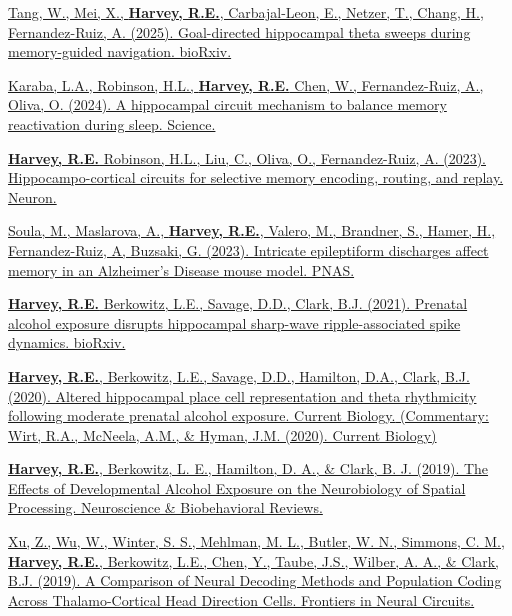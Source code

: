 \begin{cventries}
\cventry
    {} %
    {} %
    {} %
    {} %
    {
      \begin{cvitems} %
      \setlength\itemsep{0.5em}
            \item {\href{ https://doi.org/10.1101/2025.08.26.672489}{Tang, W., Mei, X., \textbf{Harvey, R.E.}, Carbajal-Leon, E., Netzer, T., Chang, H., Fernandez-Ruiz, A.  (2025). Goal-directed hippocampal theta sweeps during memory-guided navigation. bioRxiv.}}     
            \item {\href{https://doi.org/10.1126/science.ado5708}{Karaba, L.A., Robinson, H.L., \textbf{Harvey, R.E.}  Chen, W., Fernandez-Ruiz, A., Oliva, O.  (2024). A hippocampal circuit mechanism to balance memory reactivation during sleep. Science.}}
            \item {\href{https://doi.org/10.1016/j.neuron.2023.04.015}{\textbf{Harvey, R.E.} Robinson, H.L., Liu, C., Oliva, O., Fernandez-Ruiz, A. (2023). Hippocampo-cortical circuits for selective memory encoding, routing, and replay. Neuron.}}
            \item {\href{https://doi.org/10.1073/pnas.2302676120 }{Soula, M., Maslarova, A., \textbf{Harvey, R.E.}, Valero, M., Brandner, S., Hamer, H., Fernandez-Ruiz, A, Buzsaki, G. (2023). Intricate epileptiform discharges affect memory in an Alzheimer's Disease mouse model. PNAS.}}
            \item {\href{https://doi.org/10.1101/2021.06.29.450435}{\textbf{Harvey, R.E.} Berkowitz, L.E., Savage, D.D., Clark, B.J. (2021). Prenatal alcohol exposure disrupts hippocampal sharp-wave ripple-associated spike dynamics. bioRxiv.}}
            \item {\href{https://doi.org/10.1016/j.cub.2020.06.077}{\textbf{Harvey, R.E.}, Berkowitz, L.E., Savage, D.D., Hamilton, D.A., Clark, B.J. (2020). Altered hippocampal place cell representation and theta rhythmicity following moderate prenatal alcohol exposure. Current Biology.}\href{https://doi.org/10.1016/j.cub.2020.07.020}{{ (\scriptsize Commentary: Wirt, R.A., McNeela, A.M., \& Hyman, J.M. (2020). Current Biology})}}
            \item {\href{https://doi.org/10.1016/j.neubiorev.2019.09.018}{\textbf{Harvey, R.E.}, Berkowitz, L. E., Hamilton, D. A., \& Clark, B. J. (2019). The Effects of Developmental Alcohol Exposure on the Neurobiology of Spatial Processing. Neuroscience \& Biobehavioral Reviews.}}
            \item {\href{https://doi.org/10.3389/fncir.2019.00075}{Xu, Z., Wu, W., Winter, S. S., Mehlman, M. L., Butler, W. N., Simmons, C. M., \textbf{Harvey, R.E.}, Berkowitz, L.E., Chen, Y., Taube, J.S., Wilber, A. A., \& Clark, B.J. (2019). A Comparison of Neural Decoding Methods and Population Coding Across Thalamo-Cortical Head Direction Cells. Frontiers in Neural Circuits.}}

\end{cvitems}}
\end{cventries}

